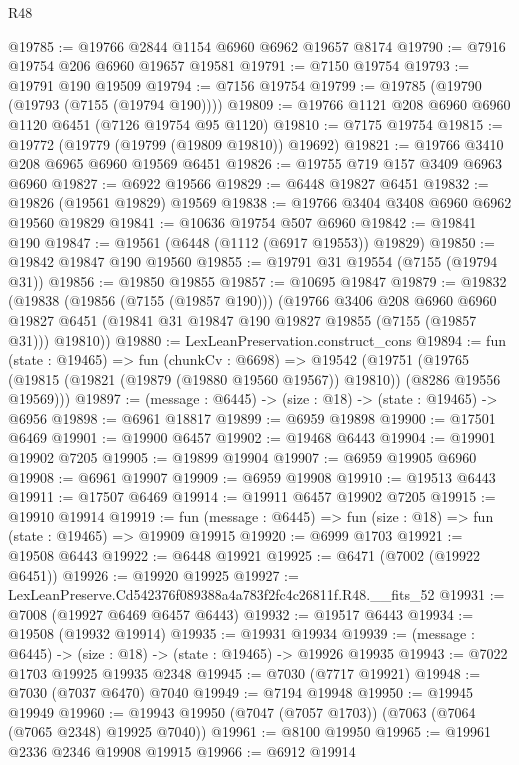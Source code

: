 \begin{lexlean}{R48}
\begin{coremodule}
@19785 := @19766 @2844 @1154 @6960 @6962 @19657 @8174
@19790 := @7916 @19754 @206 @6960 @19657 @19581
@19791 := @7150 @19754
@19793 := @19791 @190 @19509
@19794 := @7156 @19754
@19799 := @19785 (@19790 (@19793 (@7155 (@19794 @190))))
@19809 := @19766 @1121 @208 @6960 @6960 @1120 @6451 (@7126 @19754 @95 @1120)
@19810 := @7175 @19754
@19815 := @19772 (@19779 (@19799 (@19809 @19810)) @19692)
@19821 := @19766 @3410 @208 @6965 @6960 @19569 @6451
@19826 := @19755 @719 @157 @3409 @6963 @6960
@19827 := @6922 @19566
@19829 := @6448 @19827 @6451
@19832 := @19826 (@19561 @19829) @19569
@19838 := @19766 @3404 @3408 @6960 @6962 @19560 @19829
@19841 := @10636 @19754 @507 @6960
@19842 := @19841 @190
@19847 := @19561 (@6448 (@1112 (@6917 @19553)) @19829)
@19850 := @19842 @19847 @190 @19560
@19855 := @19791 @31 @19554 (@7155 (@19794 @31))
@19856 := @19850 @19855
@19857 := @10695 @19847
@19879 := @19832
    (@19838
      (@19856 (@7155 (@19857 @190)))
      (@19766
        @3406
        @208
        @6960
        @6960
        @19827
        @6451
        (@19841 @31 @19847 @190 @19827 @19855 (@7155 (@19857 @31)))
        @19810))
@19880 := LexLeanPreservation.construct_cons
@19894 := fun (state : @19465) =>
  fun (chunkCv : @6698) =>
  @19542
    (@19751 (@19765 (@19815 (@19821 (@19879 (@19880 @19560 @19567)) @19810)) (@8286 @19556 @19569)))
@19897 := (message : @6445) -> (size : @18) -> (state : @19465) -> @6956
@19898 := @6961 @18817
@19899 := @6959 @19898
@19900 := @17501 @6469
@19901 := @19900 @6457
@19902 := @19468 @6443
@19904 := @19901 @19902 @7205
@19905 := @19899 @19904
@19907 := @6959 @19905 @6960
@19908 := @6961 @19907
@19909 := @6959 @19908
@19910 := @19513 @6443
@19911 := @17507 @6469
@19914 := @19911 @6457 @19902 @7205
@19915 := @19910 @19914
@19919 := fun (message : @6445) => fun (size : @18) => fun (state : @19465) => @19909 @19915
@19920 := @6999 @1703
@19921 := @19508 @6443
@19922 := @6448 @19921
@19925 := @6471 (@7002 (@19922 @6451))
@19926 := @19920 @19925
@19927 := LexLeanPreserve.Cd542376f089388a4a783f2fc4c26811f.R48.__fits_52
@19931 := @7008 (@19927 @6469 @6457 @6443)
@19932 := @19517 @6443
@19934 := @19508 (@19932 @19914)
@19935 := @19931 @19934
@19939 := (message : @6445) -> (size : @18) -> (state : @19465) -> @19926 @19935
@19943 := @7022 @1703 @19925 @19935 @2348
@19945 := @7030 (@7717 @19921)
@19948 := @7030 (@7037 @6470) @7040
@19949 := @7194 @19948
@19950 := @19945 @19949
@19960 := @19943 @19950 (@7047 (@7057 @1703)) (@7063 (@7064 (@7065 @2348) @19925 @7040))
@19961 := @8100 @19950
@19965 := @19961 @2336 @2346 @19908 @19915
@19966 := @6912 @19914

\end{coremodule}
\end{lexlean}
